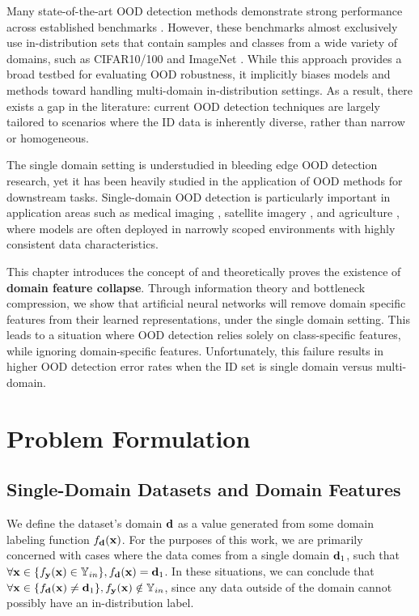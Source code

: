 \documentclass[11pt, oneside]{book}
\theoremstyle{plain}
\theoremstyle{definition}
\theoremstyle{remark}
\begin{document}
Many state-of-the-art OOD detection methods demonstrate strong performance across established benchmarks \citep{zhang2023openood}. However, these benchmarks almost exclusively use in-distribution sets that contain samples and classes from a wide variety of domains, such as CIFAR10/100 \citep{cifar10} and ImageNet \citep{deng2009imagenet}. While this approach provides a broad testbed for evaluating OOD robustness, it implicitly biases models and methods toward handling multi-domain in-distribution settings. As a result, there exists a gap in the literature: current OOD detection techniques are largely tailored to scenarios where the ID data is inherently diverse, rather than narrow or homogeneous.

The single domain setting is understudied in bleeding edge OOD detection research, yet it has been heavily studied in the application of OOD methods for downstream tasks. Single-domain OOD detection is particularly important in application areas such as medical imaging \citep{zhang2021out}, satellite imagery \citep{ekim2024distribution}, and agriculture \citep{saadati2024out}, where models are often deployed in narrowly scoped environments with highly consistent data characteristics.

This chapter introduces the concept of and theoretically proves the existence of \textbf{domain feature collapse}. Through information theory and bottleneck compression, we show that artificial neural networks will remove domain specific features from their learned representations, under the single domain setting. This leads to a situation where OOD detection relies solely on class-specific features, while ignoring domain-specific features. Unfortunately, this failure results in higher OOD detection error rates when the ID set is single domain versus multi-domain.

\section{Problem Formulation}

\subsection{Single-Domain Datasets and Domain Features}

We define the dataset's domain ${\mathbf{d}}$ as a value generated from some domain labeling function $f_{{\mathbf{d}}}({\mathbf{x}})$. For the purposes of this work, we are primarily concerned with cases where the data comes from a single domain ${\mathbf{d}}_1$, such that $\forall {\mathbf{x}} \in  \{f_{{\mathbf{y}}}({\mathbf{x}}) \in  {\mathbb{Y}}_{in}\}, f_{{\mathbf{d}}}({\mathbf{x}}) = {\mathbf{d}}_1$. In these situations, we can conclude that $\forall {\mathbf{x}} \in \{f_{{\mathbf{d}}}({\mathbf{x}}) \neq {\mathbf{d}}_1\}, f_{{\mathbf{y}}}({\mathbf{x}}) \notin {\mathbb{Y}}_{in}$, since any data outside of the domain cannot possibly have an in-distribution label.
\end{document}
